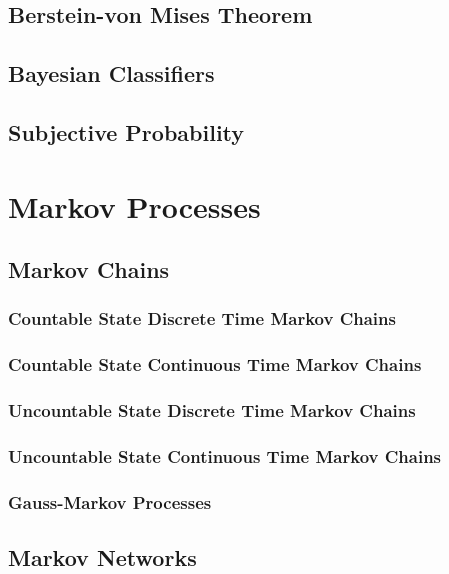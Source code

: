 \documentclass[11pt]{report} %
\begin{document}
\section{Berstein-von Mises Theorem}

\section{Bayesian Classifiers}

\section{Subjective Probability \cite{Schervish1995}}

\chapter{Markov Processes}

\section{Markov Chains}

\subsection{Countable State Discrete Time Markov Chains}

\subsection{Countable State Continuous Time Markov Chains}

\subsection{Uncountable State Discrete Time Markov Chains}

\subsection{Uncountable State Continuous Time Markov Chains}

\subsection{Gauss-Markov Processes}

\section{Markov Networks}
\end{document}
